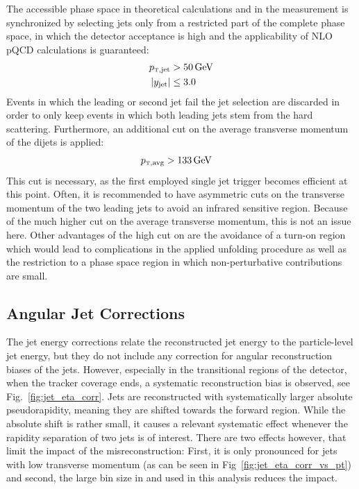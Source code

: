The accessible phase space in theoretical calculations and in the measurement is
synchronized by selecting jets only from a restricted part of the complete phase
space, in which the detector acceptance is high and the applicability of NLO
pQCD calculations is guaranteed:
%
\begin{align*}
    \ptjet &> \SI{50}{\GeV}\\
    |y_\mathrm{jet}| &\leq 3.0\\
\end{align*}
%
Events in which the leading or second jet fail the jet selection are
discarded in order to only keep events in which both leading jets stem
from the hard scattering. Furthermore, an additional cut on the
average transverse momentum of the dijets is applied:
%
\begin{align*}
    \ptavg &> \SI{133}{\GeV}
\end{align*}
%
This cut is necessary, as the first employed single jet trigger becomes
efficient at this point. Often, it is recommended to have asymmetric cuts on the
transverse momentum of the two leading jets to avoid an infrared sensitive
region. Because of the much higher cut on the average transverse momentum, this
is not an issue here. Other advantages of the high cut on \ptavg are the
avoidance of a turn-on region which would lead to complications in the applied
unfolding procedure as well as the restriction to a phase space region in which
non-perturbative contributions are small.

\subsection{Angular Jet Corrections}

The jet energy corrections relate the reconstructed jet energy to the particle-level jet energy, but they do not include any correction for angular
reconstruction biases of the jets. However, especially in the transitional
regions of the detector, \ie when the tracker coverage ends, a systematic
reconstruction bias is observed, see Fig.~\ref{fig:jet_eta_corr}. Jets are
reconstructed with systematically larger absolute pseudorapidity, meaning they
are shifted towards the forward region. While the absolute shift is rather
small, it causes a relevant systematic effect whenever the rapidity separation
of two jets is of interest. There are two effects however, that limit the impact of the
misreconstruction: First, it is only pronounced for jets with low transverse momentum
(as can be seen in Fig~\ref{fig:jet_eta_corr_vs_pt}) and second, the large bin
size in \ystar and \yboost used in this analysis reduces the impact. 

